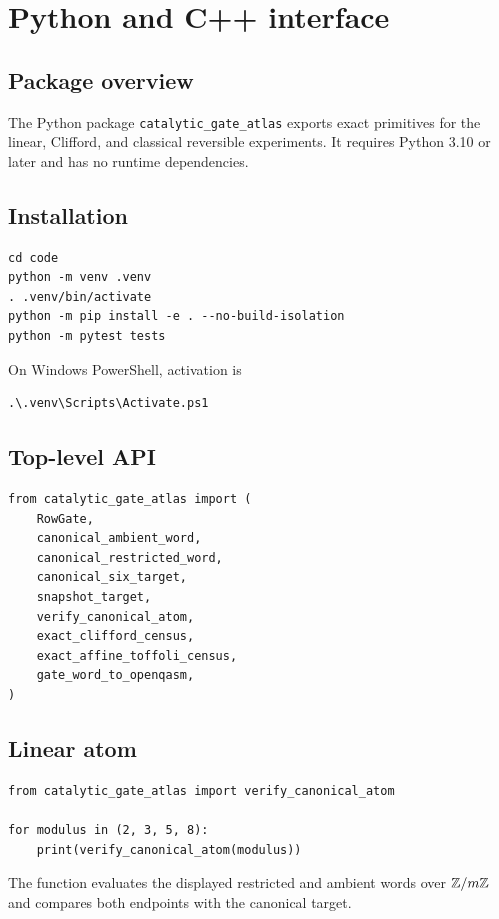 \section{Python and C++ interface}\label{g:app:api}


\subsection{Package overview}
The Python package \texttt{catalytic\_gate\_atlas} exports exact primitives for the linear, Clifford, and classical reversible experiments.  It requires Python 3.10 or later and has no runtime dependencies.

\subsection{Installation}
\begin{lstlisting}[style=pythonstyle]
cd code
python -m venv .venv
. .venv/bin/activate
python -m pip install -e . --no-build-isolation
python -m pytest tests
\end{lstlisting}
On Windows PowerShell, activation is
\begin{verbatim}
.\.venv\Scripts\Activate.ps1
\end{verbatim}

\subsection{Top-level API}
\begin{lstlisting}[style=pythonstyle]
from catalytic_gate_atlas import (
    RowGate,
    canonical_ambient_word,
    canonical_restricted_word,
    canonical_six_target,
    snapshot_target,
    verify_canonical_atom,
    exact_clifford_census,
    exact_affine_toffoli_census,
    gate_word_to_openqasm,
)
\end{lstlisting}

\subsection{Linear atom}
\begin{lstlisting}[style=pythonstyle]
from catalytic_gate_atlas import verify_canonical_atom

for modulus in (2, 3, 5, 8):
    print(verify_canonical_atom(modulus))
\end{lstlisting}
The function evaluates the displayed restricted and ambient words over $\mathbb Z/m\mathbb Z$ and compares both endpoints with the canonical target.

